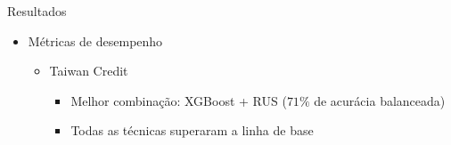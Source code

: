 \begin{frame}{Resultados}

  \begin{itemize}
    \item[$\blacktriangleright$] Métricas de desempenho
      \begin{itemize}
        \item Taiwan Credit
          \begin{itemize}
            \item[$\checkmark$] Melhor combinação: XGBoost + RUS ($71\%$ de acurácia balanceada)
            \item[$\checkmark$] Todas as técnicas superaram a linha de base
          \end{itemize}
      \end{itemize}
  \end{itemize}

  \scriptsize
  \setlength{\tabcolsep}{2pt}
  \renewcommand{\arraystretch}{1.05}


\end{frame}
